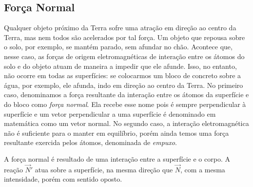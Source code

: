 \subsection{Força Normal} 

Qualquer objeto próximo da Terra sofre uma atração em direção ao centro da Terra, mas nem todos são acelerados por tal força. Um objeto que repousa sobre o solo, por exemplo, se mantém parado, sem afundar no chão. Acontece que, nesse caso, as forças de origem eletromagnéticas de interação entre os átomos do solo e do objeto atuam de maneira a impedir que ele afunde. Isso, no entanto, não ocorre em todas as superfícies: se colocarmos um bloco de concreto sobre a água, por exemplo, ele afunda, indo em direção ao centro da Terra. No primeiro caso, denominamos a força resultante da interação entre os átomos da superfície e do bloco como \emph{força normal}. Ela recebe esse nome pois é sempre perpendicular à superfície e um vetor perpendicular a uma superfície é denominado em matemática como um vetor normal. No segundo caso, a interação eletromagnética não é suficiente para o manter em equilíbrio, porém ainda temos uma força resultante exercida pelos átomos, denominada de \emph{empuxo}.

\begin{marginfigure}[-4cm]
\centering
{}
\caption{A força normal é resultado de uma interação entre a superfície e o corpo. A reação $\vec{N}'$ atua sobre a superfície, na mesma direção que $\vec{N}$, com a mesma intensidade, porém com sentido oposto.}
\end{marginfigure}

